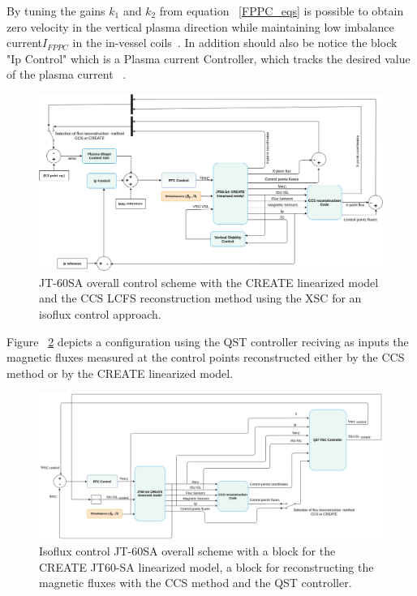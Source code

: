  By tuning the gains $k_1$ and $k_2$ from equation ~\ref{FPPC_eqs} is possible to obtain zero velocity in the vertical plasma direction while maintaining low imbalance current$  I_{FPPC} $ in the in-vessel coils~\cite[Sec.~4.1]{NCruz}.  In addition should also be notice the block "Ip Control" which is a Plasma current Controller, which tracks the desired value of the plasma current ~\cite{de2014shape}.

 
 
\begin{figure}
	\centering
	\includegraphics[width=1.05\textwidth]{Chp3/JT60Schemes1.png}
	\caption{	\label{JT60controlscheme}JT-60SA overall control scheme with the CREATE linearized model and the CCS LCFS reconstruction method  using the XSC for an isoflux control approach.}
\end{figure}

Figure ~\ref{JT60FBCcheme} depicts a configuration using the QST controller reciving as inputs the magnetic fluxes measured at the control points reconstructed either by the CCS method or by the CREATE linearized model.
\smallskip
 
\begin{figure}
	\centering
	\includegraphics[width=1.05\textwidth]{Chp3/JT60SchemeFBCnew.png}
	\caption{	\label{JT60FBCcheme} Isoflux control JT-60SA overall scheme with  a block for the  CREATE JT60-SA linearized model, a block for reconstructing  the magnetic fluxes with the CCS method and the QST controller. }
\end{figure}




